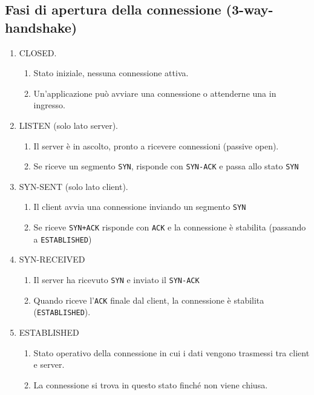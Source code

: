 \subsection{Fasi di apertura della connessione (3-way-handshake)}
\begin{enumerate}
	\item CLOSED.
	\begin{enumerate}
		\item Stato iniziale, nessuna connessione attiva.
		\item Un'applicazione può avviare una connessione o attenderne una in ingresso.
	\end{enumerate}
	\item LISTEN (solo lato server).
	\begin{enumerate}
		\item Il server è in ascolto, pronto a ricevere connessioni (passive open).
		\item Se riceve un segmento \verb|SYN|, risponde con \verb|SYN-ACK| e passa allo stato \verb|SYN|
	\end{enumerate}
	\item SYN-SENT (solo lato client).
	\begin{enumerate}
		\item Il client avvia una connessione inviando un segmento \verb|SYN|
		\item Se riceve \verb|SYN+ACK| risponde con \verb|ACK| e la connessione è stabilita (passando a \verb|ESTABLISHED|)
	\end{enumerate}
	\item SYN-RECEIVED
	\begin{enumerate}
		\item Il server ha ricevuto \verb|SYN| e inviato il \verb|SYN-ACK|
		\item Quando riceve l'\verb|ACK| finale dal client, la connessione è stabilita (\verb|ESTABLISHED|).
	\end{enumerate}
	\item ESTABLISHED
	\begin{enumerate}
		\item Stato operativo della connessione in cui i dati vengono trasmessi tra client e server.
		\item La connessione si trova in questo stato finché non viene chiusa.
	\end{enumerate}

\end{enumerate}
